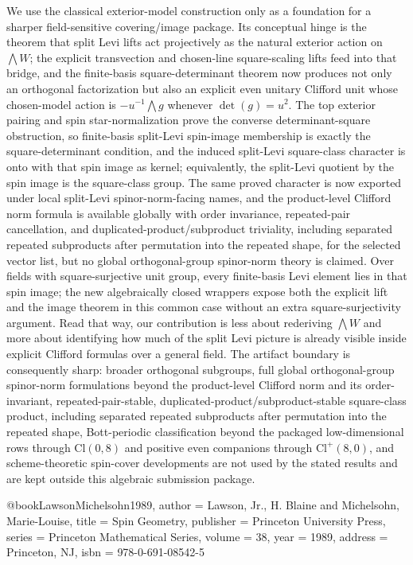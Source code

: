 \documentclass[11pt,a4paper]{article}
\theoremstyle{plain}
\theoremstyle{definition}
\theoremstyle{remark}
\newcommand{\Cl}{\mathrm{Cl}}
\begin{document}
We use the classical exterior-model construction only as a foundation
for a sharper field-sensitive covering/image package. Its conceptual hinge is
the theorem that split Levi lifts act projectively as the natural exterior
action on $\bigwedge W$; the explicit transvection and chosen-line square-scaling
lifts feed into that bridge, and the finite-basis square-determinant theorem now
produces not only an orthogonal factorization but also an explicit even unitary
Clifford unit whose chosen-model action is $-u^{-1}\bigwedge g$ whenever
$\det(g)=u^2$. The top exterior pairing and spin star-normalization prove the
converse determinant-square obstruction, so finite-basis split-Levi spin-image
membership is exactly the square-determinant condition, and the induced
split-Levi square-class character is onto with that spin image as kernel; equivalently, the
split-Levi quotient by the spin image is the square-class group. The same proved
character is now exported under local split-Levi spinor-norm-facing names, and
the product-level Clifford norm formula is available globally with order
invariance, repeated-pair cancellation, and duplicated-product/subproduct
triviality, including separated repeated subproducts after permutation into the
repeated shape, for the selected vector list, but no global orthogonal-group
spinor-norm theory is claimed. Over fields with
square-surjective unit group, every finite-basis Levi element lies in that spin
image; the new algebraically closed wrappers expose both the explicit lift and
the image theorem in this common case without an extra square-surjectivity
argument. Read that way, our contribution is less about rederiving
$\bigwedge W$ and more about identifying how much of the split Levi picture is
already visible inside explicit Clifford formulas over a general field. The
artifact boundary is consequently sharp: broader orthogonal subgroups, full
global orthogonal-group spinor-norm formulations beyond the product-level
Clifford norm and its order-invariant, repeated-pair-stable,
duplicated-product/subproduct-stable square-class product, including separated
repeated subproducts after permutation into the repeated shape, Bott-periodic
classification beyond the packaged low-dimensional rows through $\Cl(0,8)$ and positive even companions
through $\Cl^+(8,0)$, and scheme-theoretic
spin-cover developments are not used by the stated results and are kept outside
this algebraic submission package.


@book{LawsonMichelsohn1989,
  author    = {Lawson, Jr., H. Blaine and Michelsohn, Marie-Louise},
  title     = {Spin Geometry},
  publisher = {Princeton University Press},
  series    = {Princeton Mathematical Series},
  volume    = {38},
  year      = {1989},
  address   = {Princeton, NJ},
  isbn      = {978-0-691-08542-5}
}
\end{document}
